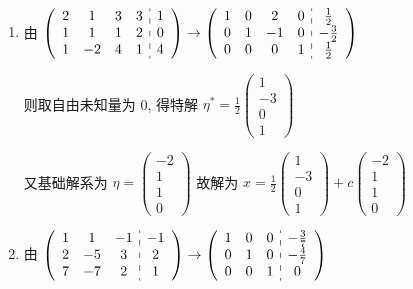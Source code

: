 	 \paragraph{} %
		 \begin{enumerate}
			 \item %
			       由 \( \left(\begin{array}{cccc:c}
					       2 & 1  & 3 & 3 & 1 \\
					       1 & 1  & 1 & 2 & 0 \\
					       1 & -2 & 4 & 1 & 4
				       \end{array}\right) \rightarrow \left(\begin{array}{cccc:c}
					       1 & 0 & 2  & 0 & \frac{1}{2}  \\
					       0 & 1 & -1 & 0 & -\frac{3}{2} \\
					       0 & 0 & 0  & 1 & \frac{1}{2}
				       \end{array}\right) \)

			       则取自由未知量为 0, 得特解 \( \eta^{*} = \frac{1}{2}\begin{pmatrix}
				       1  \\
				       -3 \\
				       0  \\
				       1
			       \end{pmatrix} \)

			       又基础解系为 \( \eta = \begin{pmatrix}
				       -2 \\
				       1  \\
				       1  \\
				       0
			       \end{pmatrix} \) 故解为 \( x = \frac{1}{2}\begin{pmatrix}
				       1  \\
				       -3 \\
				       0  \\
				       1
			       \end{pmatrix} + c\begin{pmatrix}
				       -2 \\
				       1  \\
				       1  \\
				       0
			       \end{pmatrix} \)
			 \item %
			       由 \( \left(\begin{array}{ccc:c}
					       1 & 1  & -1 & -1 \\
					       2 & -5 & 3  & 2  \\
					       7 & -7 & 2  & 1
				       \end{array}\right)
			       \to
			       \left(\begin{array}{ccc:c}
					       1 & 0 & 0 & -\frac{3}{7} \\
					       0 & 1 & 0 & -\frac{4}{7} \\
					       0 & 0 & 1 & 0
				       \end{array}\right) \)


\end{enumerate}
